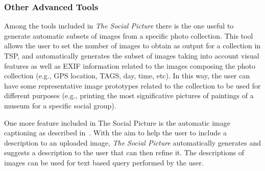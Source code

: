 \subsubsection{Other Advanced Tools}
%
Among the tools included in \textit{The Social Picture} there is the one useful to generate automatic subsets of images from a specific photo collection. This tool allows the user to set the number of images to obtain as output for a collection in TSP, and automatically generates the subset of images taking into account visual features as well as EXIF information related to the images composing the photo collection (e.g., GPS location, TAGS, day, time, etc). In this way, the user can have some representative image prototypes related to the collection to be used for different purposes (e.g., printing the most significative pictures of paintings of a museum for a specific social group).

One more feature included in The Social Picture is the automatic image captioning as described in~\cite{johnson2015densecap}. With the aim to help the user to include a description to an uploaded image, \textit{The Social Picture} automatically generates and suggests a description to the user that can then refine it.  The descriptions of images can be used for text based query performed by the user.
